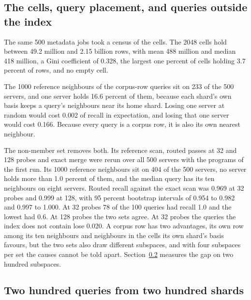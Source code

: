 \documentclass[sigconf, nonacm]{acmart}
\begin{document}
\subsection{The cells, query placement, and queries outside the index}
\label{sec:follow}

The same 500 metadata jobs took a census of the cells. The 2048 cells hold between 49.2 million
and 2.15 billion rows, with mean 488 million and median 418 million, a Gini coefficient of 0.328,
the largest one percent of cells holding 3.7 percent of rows, and no empty cell.

The 1000 reference neighbours of the corpus-row queries sit on 233 of the 500 servers, and one
server holds 16.6 percent of them, because each shard's own basis keeps a query's neighbours near
its home shard. Losing one server at random would cost 0.002 of recall in expectation, and losing
that one server would cost 0.166. Because every query is a corpus row, it is also its own nearest
neighbour.

The non-member set removes both. Its reference scan, routed passes at 32 and 128 probes and exact
merge were rerun over all 500 servers with the programs of the first run. Its 1000 reference
neighbours sit on 404 of the 500 servers, no server holds more than 1.0 percent of them, and the
median query has its ten neighbours on eight servers. Routed recall against the exact scan was
0.969 at 32 probes and 0.999 at 128, with 95 percent bootstrap intervals of 0.954 to 0.982 and 0.997
to 1.000. At 32 probes 78 of the 100 queries had recall 1.0 and the lowest had 0.6. At 128 probes
the two sets agree. At 32 probes the queries the index does not contain lose 0.020. A corpus row
has two advantages, its own row among its ten neighbours and neighbours in the cells its own
shard's basis favours, but the two sets also draw different subspaces, and with four subspaces per
set the causes cannot be told apart. Section~\ref{sec:regen} measures the gap on two hundred
subspaces.

\subsection{Two hundred queries from two hundred shards}
\label{sec:regen}
\end{document}
